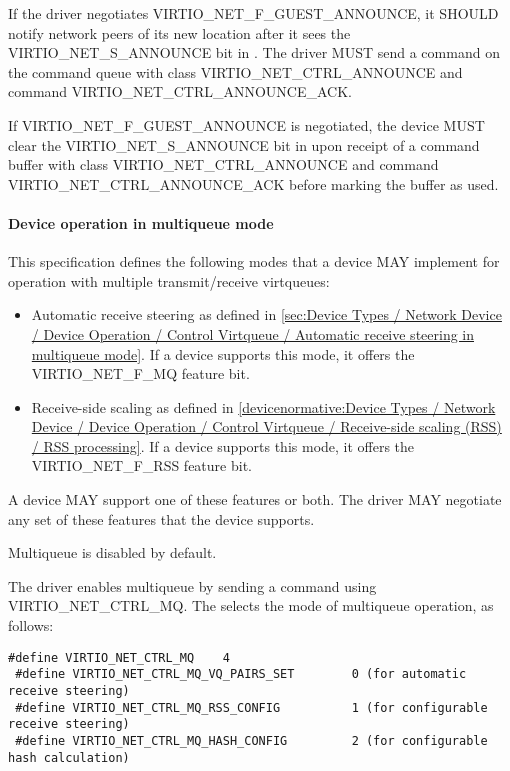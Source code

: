 
If the driver negotiates VIRTIO_NET_F_GUEST_ANNOUNCE, it SHOULD notify
network peers of its new location after it sees the VIRTIO_NET_S_ANNOUNCE bit
in .  The driver MUST send a command on the command queue
with class VIRTIO_NET_CTRL_ANNOUNCE and command VIRTIO_NET_CTRL_ANNOUNCE_ACK.


If VIRTIO_NET_F_GUEST_ANNOUNCE is negotiated, the device MUST clear the
VIRTIO_NET_S_ANNOUNCE bit in  upon receipt of a command buffer
with class VIRTIO_NET_CTRL_ANNOUNCE and command VIRTIO_NET_CTRL_ANNOUNCE_ACK
before marking the buffer as used.

\paragraph{Device operation in multiqueue mode}\label{sec:Device Types / Network Device / Device Operation / Control Virtqueue / Device operation in multiqueue mode}

This specification defines the following modes that a device MAY implement for operation with multiple transmit/receive virtqueues:
\begin{itemize}
\item Automatic receive steering as defined in \ref{sec:Device Types / Network Device / Device Operation / Control Virtqueue / Automatic receive steering in multiqueue mode}.
 If a device supports this mode, it offers the VIRTIO_NET_F_MQ feature bit.
\item Receive-side scaling as defined in \ref{devicenormative:Device Types / Network Device / Device Operation / Control Virtqueue / Receive-side scaling (RSS) / RSS processing}.
 If a device supports this mode, it offers the VIRTIO_NET_F_RSS feature bit.
\end{itemize}

A device MAY support one of these features or both. The driver MAY negotiate any set of these features that the device supports.

Multiqueue is disabled by default.

The driver enables multiqueue by sending a command using  VIRTIO_NET_CTRL_MQ. The  selects the mode of multiqueue operation, as follows:
\begin{lstlisting}
#define VIRTIO_NET_CTRL_MQ    4
 #define VIRTIO_NET_CTRL_MQ_VQ_PAIRS_SET        0 (for automatic receive steering)
 #define VIRTIO_NET_CTRL_MQ_RSS_CONFIG          1 (for configurable receive steering)
 #define VIRTIO_NET_CTRL_MQ_HASH_CONFIG         2 (for configurable hash calculation)
\end{lstlisting}

